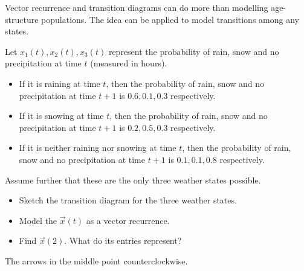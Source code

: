 \documentclass[../main.tex]{subfiles}
\begin{document}
\begin{exercise}
  Vector recurrence and transition diagrams can do more than modelling age-structure populations. The idea can be applied to model transitions among any states. 

  Let \(x_{1}(t), x_{2}(t), x_{3}(t)\) represent the probability of rain, snow and no precipitation at time \(t\) (measured in hours).  
  \begin{itemize}
    \item If it is raining at time \(t\), then the probability of rain, snow and no precipitation at time \(t+1\) is \(0.6, 0.1, 0.3\) respectively.
    \item If it is snowing at time \(t\), then the probability of rain, snow and no precipitation at time \(t+1\) is \(0.2, 0.5, 0.3\) respectively.
    \item If it is neither raining nor snowing at time \(t\), then the probability of rain, snow and no precipitation at time \(t+1\) is \(0.1, 0.1, 0.8\) respectively.
  \end{itemize}
  Assume further that these are the only three weather states possible.  
  \begin{itemize}
    \item Sketch the transition diagram for the three weather states.
    \item Model the \(\vec{x}(t)\) as a vector recurrence.  
    \item Find \(\vec{x}(2)\). What do its entries represent?
  \end{itemize}

  \begin{solution}
    The arrows in the middle point counterclockwise.

\end{solution}
\end{exercise}
\end{document}
